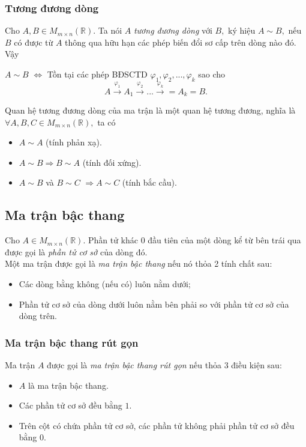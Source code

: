 \subsubsection{Tương đương dòng}
Cho $A, B \in M_{m \times n} \left( {\mathbb{R}} \right).$ Ta nói $A$ \textit{tương đương dòng} với $B,$ ký hiệu $A \sim B,$ nếu $B$ có được từ $A$ thông qua hữu hạn các phép biến đổi sơ cấp trên dòng nào đó. Vậy
\begin{center}
$A \sim B$ $\Leftrightarrow$ Tồn tại các phép BĐSCTD $\varphi_1, \varphi_2, ..., \varphi_k$ sao cho
$$A\mathop  \to \limits^{{\varphi _1}} {A_1}\mathop  \to \limits^{{\varphi _2}} ...\mathop  \to \limits^{{\varphi _k}}  = {A_k} = B.$$
\end{center}
\begin{mybox}
Quan hệ tương đương dòng của ma trận là một quan hệ tương đương, nghĩa là $\forall A, B, C \in M_{m \times n} \left( {\mathbb{R}} \right),$ ta có
\begin{itemize}
\item $A \sim A$ (tính phản xạ).
\item $A \sim B \Rightarrow B \sim A$ (tính đối xứng).
\item $A \sim B$ và $B \sim C$ $\Rightarrow A \sim C$ (tính bắc cầu).
\end{itemize}
\end{mybox}
\subsection{Ma trận bậc thang}
Cho $A \in M_{m \times n} \left( {\mathbb{R}} \right).$ Phần tử khác $0$ đầu tiên của một dòng kể từ bên trái qua được gọi là \textit{phần tử cơ sở} của dòng đó.\\
Một ma trận được gọi là \textit{ma trận bậc thang} nếu nó thỏa 2 tính chất sau:
\begin{itemize}
\item Các dòng bằng không (nếu có) luôn nằm dưới;
\item Phần tử cơ sở của dòng dưới luôn nằm bên phải so với phần tử cơ sở của dòng trên.
\end{itemize}
\subsubsection{Ma trận bậc thang rút gọn}
Ma trận $A$ được gọi là \textit{ma trận bậc thang rút gọn} nếu thỏa 3 điều kiện sau:
\begin{itemize}
\item $A$ là ma trận bậc thang.
\item Các phần tử cơ sở đều bằng $1.$
\item Trên cột có chứa phần tử cơ sở, các phần tử không phải phần tử cơ sở đều bằng $0.$
\end{itemize}
